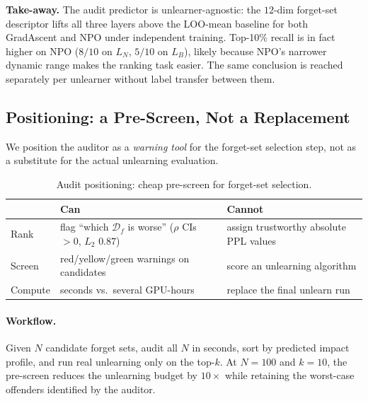 \documentclass[11pt,a4paper]{article}
\newcommand{\Df}{\mathcal{D}_f}
\newcommand{\Ltwo}{L_2}
\newcommand{\Lneigh}{L_N}
\newcommand{\Lbyst}{L_B}
\begin{document}
\textbf{Take-away.} The audit predictor is unlearner-agnostic: the $12$-dim
forget-set descriptor lifts all three layers above the LOO-mean baseline for
both GradAscent and NPO under independent training. Top-10\% recall is in fact
higher on NPO ($8/10$ on $\Lneigh$, $5/10$ on $\Lbyst$), likely because NPO's
narrower dynamic range makes the ranking task easier. The same conclusion is
reached separately per unlearner without label transfer between them.

\subsection{Positioning: a Pre-Screen, Not a Replacement}
\label{sec:positioning}

We position the auditor as a \emph{warning tool} for the forget-set selection step, not as a substitute for the actual unlearning evaluation.

\begin{table}[t]
\centering
\small
\setlength{\tabcolsep}{3pt}
\renewcommand{\arraystretch}{1.05}
\begin{tabular}{@{}p{} p{} p{}@{}}
    \toprule
              & \textbf{Can}                                  & \textbf{Cannot} \\
    \midrule
    Rank      & flag ``which $\Df$ is worse'' ($\rho$ CIs $\!>\!0$, $\Ltwo$ $0.87$) & assign trustworthy absolute PPL values \\
    Screen    & red/yellow/green warnings on candidates       & score an unlearning algorithm \\
    Compute   & seconds vs.\ several GPU-hours                & replace the final unlearn run \\
    \bottomrule
\end{tabular}
\caption{Audit positioning: cheap pre-screen for forget-set selection.}
\label{tab:positioning}
\end{table}

\paragraph{Workflow.} Given $N$ candidate forget sets, audit all $N$ in seconds, sort by predicted impact profile, and run real unlearning only on the top-$k$. At $N{=}100$ and $k{=}10$, the pre-screen reduces the unlearning budget by $10\times$ while retaining the worst-case offenders identified by the auditor.

\end{document}
